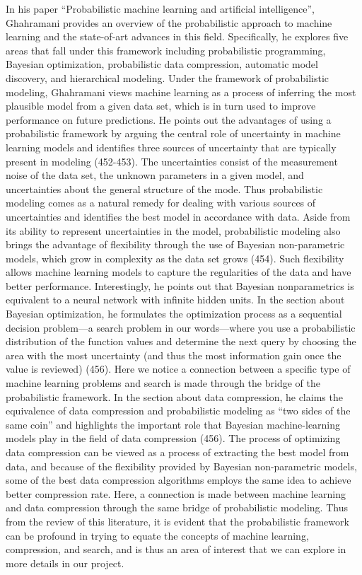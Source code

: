 \documentclass[12pt]{article}
\begin{document}
In his paper “Probabilistic machine learning and artificial intelligence”, Ghahramani provides an
overview of the probabilistic approach to machine learning and the state-of-art advances in
this field. Specifically, he explores five areas that fall under this framework including
probabilistic programming, Bayesian optimization, probabilistic data compression, automatic
model discovery, and hierarchical modeling. Under the framework of probabilistic modeling,
Ghahramani views machine learning as a process of inferring the most plausible model from a
given data set, which is in turn used to improve performance on future predictions. He points
out the advantages of using a probabilistic framework by arguing the central role of uncertainty
in machine learning models and identifies three sources of uncertainty that are typically present
in modeling (452-453). The uncertainties consist of the measurement noise of the data set, the
unknown parameters in a given model, and uncertainties about the general structure of the
mode. Thus probabilistic modeling comes as a natural remedy for dealing with various sources
of uncertainties and identifies the best model in accordance with data. Aside from its ability to
represent uncertainties in the model, probabilistic modeling also brings the advantage of
flexibility through the use of Bayesian non-parametric models, which grow in complexity as the
data set grows (454). Such flexibility allows machine learning models to capture the regularities
of the data and have better performance. Interestingly, he points out that Bayesian nonparametrics is equivalent to a neural network with infinite hidden units. In the section about
Bayesian optimization, he formulates the optimization process as a sequential decision
problem—a search problem in our words—where you use a probabilistic distribution of the
function values and determine the next query by choosing the area with the most uncertainty
(and thus the most information gain once the value is reviewed) (456). Here we notice a
connection between a specific type of machine learning problems and search is made through
the bridge of the probabilistic framework. In the section about data compression, he claims the
equivalence of data compression and probabilistic modeling as “two sides of the same coin”
and highlights the important role that Bayesian machine-learning models play in the field of
data compression (456). The process of optimizing data compression can be viewed as a
process of extracting the best model from data, and because of the flexibility provided by
Bayesian non-parametric models, some of the best data compression algorithms employs the
same idea to achieve better compression rate. Here, a connection is made between machine
learning and data compression through the same bridge of probabilistic modeling. Thus from
the review of this literature, it is evident that the probabilistic framework can be profound in
trying to equate the concepts of machine learning, compression, and search, and is thus an
area of interest that we can explore in more details in our project. 
\end{document}
